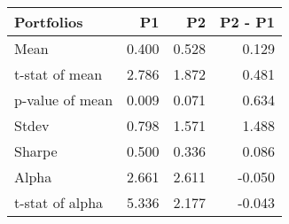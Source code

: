\begin{tabular}{lrrr}
\toprule
Portfolios & P1 & P2 & P2 - P1 \\
\midrule
Mean & 0.400 & 0.528 & 0.129 \\
t-stat of mean & 2.786 & 1.872 & 0.481 \\
p-value of mean & 0.009 & 0.071 & 0.634 \\
Stdev & 0.798 & 1.571 & 1.488 \\
Sharpe & 0.500 & 0.336 & 0.086 \\
Alpha & 2.661 & 2.611 & -0.050 \\
t-stat of alpha & 5.336 & 2.177 & -0.043 \\
\bottomrule
\end{tabular}

